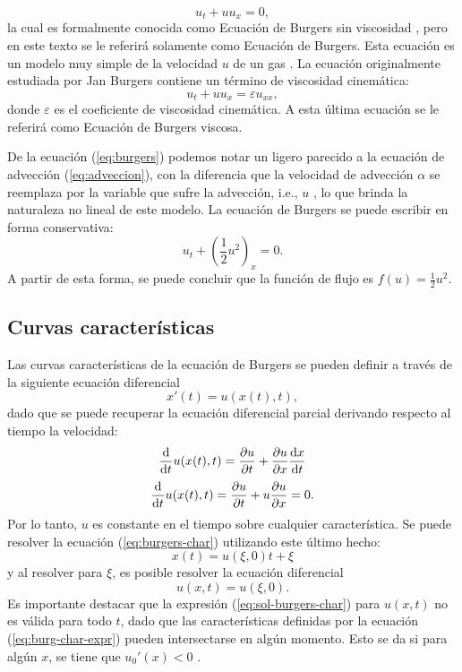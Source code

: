 \begin{equation}
	u_t + u u_x = 0,
	\label{eq:burgers}
\end{equation}
la cual es formalmente conocida como Ecuación de Burgers sin viscosidad \cite{Leveque}, pero en este texto se le referirá solamente como Ecuación de Burgers. Esta ecuación es un modelo muy simple de la velocidad $u$ de un gas \cite{Cameron}. La ecuación originalmente estudiada por Jan Burgers \cite{Leveque} contiene un término de viscosidad cinemática:
\begin{equation}
	u_t + u u_x = \varepsilon u_{xx},
	\label{eq:burgers-vis}
\end{equation}
donde $\varepsilon$ es el coeficiente de viscosidad cinemática. A esta última ecuación se le referirá como Ecuación de Burgers viscosa.

De la ecuación (\ref{eq:burgers}) podemos notar un ligero parecido a la ecuación de advección (\ref{eq:adveccion}), con la diferencia que la velocidad de advección $\alpha$ se reemplaza por la variable que sufre la advección, i.e., $u$ \cite{Leveque}, lo que brinda la naturaleza no lineal de este modelo. La ecuación de Burgers se puede escribir en forma conservativa:
\begin{equation}
	u_t + \left(\frac{1}{2}u^{2}\right)_x = 0.
	\label{eq:burgers-cons}
\end{equation}
A partir de esta forma, se puede concluir que la función de flujo es $f(u) = \frac{1}{2}u^{2}$.
\subsection{Curvas características}
Las curvas características de la ecuación de Burgers se pueden definir a través de la siguiente ecuación diferencial \cite{Leveque}
\begin{equation}
	x'(t) = u(x(t),t),
	\label{eq:burgers-char}
\end{equation}
dado que se puede recuperar la ecuación diferencial parcial derivando respecto al tiempo la velocidad:
\begin{equation}
	\dv{t} u(x(t),t) = \pdv{u}{t} + \pdv{u}{x} \dv{x}{t}
\end{equation}
\begin{equation}
	\dv{t} u(x(t),t) = \pdv{u}{t} + u\pdv{u}{x} = 0.
\end{equation}
Por lo tanto, $u$ es constante en el tiempo sobre cualquier característica. Se puede resolver la ecuación (\ref{eq:burgers-char}) utilizando este último hecho:
\begin{equation}
	x(t) = u(\xi,0)t + \xi
	\label{eq:burg-char-expr}
\end{equation}
y al resolver para $\xi$, es posible resolver la ecuación diferencial \cite{Leveque}
\begin{equation}
	u(x,t) = u(\xi, 0).
	\label{eq:sol-burgers-char}
\end{equation}
Es importante destacar que la expresión (\ref{eq:sol-burgers-char}) para $u(x,t)$ no es válida para todo $t$, dado que las características definidas por la ecuación (\ref{eq:burg-char-expr}) pueden intersectarse en algún momento. Esto se da si para algún $x$, se tiene que $u_0'(x) < 0$ \cite{Leveque}. 

